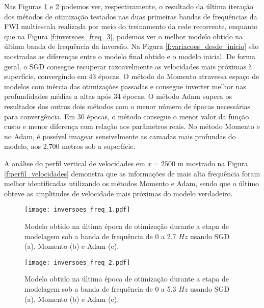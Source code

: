     Nas Figuras \ref{f:inversoes_freq_1} e \ref{f:inversoes_freq_2} podemos ver, respectivamente, o resultado da última iteração dos métodos de otimização testados nas duas primeiras bandas de frequências da FWI multiescala realizada por meio do treinamento da rede recorrente, enquanto que na Figura \ref{f:inversoes_freq_3}, podemos ver o melhor modelo obtido na última banda de frequência da inversão. Na Figura \ref{f:variacoes_desde_inicio} são mostradas as diferenças entre o modelo final obtido e o modelo inicial. De forma geral, o SGD consegue recuperar razoavelmente as velocidades mais próximas à superfície, convergindo em 43 épocas. O método do Momento atravessa espaço de modelos com inércia das otimizações passadas e consegue inverter melhor nas profundidades médias a altas após 34 épocas. O método Adam supera os resultados dos outros dois métodos com o menor número de épocas necessárias para convergência. Em 30 épocas, o método consegue o menor valor da função custo e menor diferença com relação aos parâmetros reais. No método Momento e no Adam, é possível imagear \DIFdelbegin {}\DIFdelend sensivelmente as camadas mais profundas do modelo, aos 2,700 metros sob a superfície.

    A análise do perfil vertical de velocidades em $x=2500$ m mostrado na Figura \ref{f:perfil_velocidades} demonstra que as informações de mais alta frequência foram melhor identificadas utilizando os métodos Momento e Adam, sendo que o último obteve as amplitudes de velocidade mais próximas do modelo verdadeiro.

    \begin{figure}
      \begin{center}
        \texttt{[image: inversoes\_freq\_1.pdf]}
      \end{center}
      \caption{Modelo obtido na última época de otimização durante a etapa de modelagem sob a banda de frequência de 0 a 2.7 $Hz$ usando SGD (a), Momento (b) e Adam (c).}
      \label{f:inversoes_freq_1}
    \end{figure}

    \begin{figure}
      \begin{center}
        \texttt{[image: inversoes\_freq\_2.pdf]}
      \end{center}
      \caption{Modelo obtido na última época de otimização durante a etapa de modelagem sob a banda de frequência de 0 a 5.3 $Hz$ usando SGD (a), Momento (b) e Adam (c).}
      \label{f:inversoes_freq_2}
    \end{figure}

